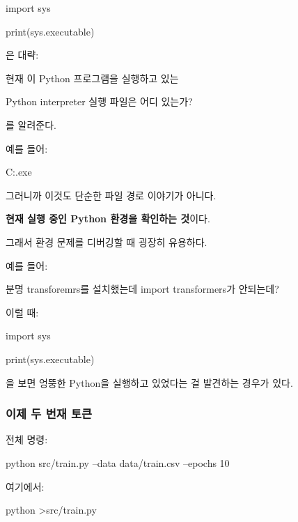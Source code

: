 \begin{dhkcode}
import sys

print(sys.executable)
\end{dhkcode}

은 대략:

\begin{dhknote}
\begin{dhksmry}[centered]
현재 이 Python 프로그램을 실행하고 있는

Python interpreter 실행 파일은 어디 있는가?
\end{dhksmry}
\end{dhknote}

를 알려준다.

예를 들어:

\begin{dhkzsh}
C:\Users\user{}\envs\transformer\python.exe
\end{dhkzsh}

그러니까 이것도 단순한 파일 경로 이야기가 아니다.

\textbf{현재 실행 중인 Python 환경을 확인하는 것}이다.

그래서 환경 문제를 디버깅할 때 굉장히 유용하다.

예를 들어:

\begin{dhksmry}[centered]
분명 transforemrs를 설치했는데 import transformers가 안되는데?
\end{dhksmry}

이럴 때:

\begin{dhkcode}
import sys

print(sys.executable)
\end{dhkcode}

을 보면 엉뚱한 Python을 실행하고 있었다는 걸 발견하는 경우가 있다.

\subsubsection{이제 두 번재 토큰 }

전체 명령:

\begin{dhkzsh}
python src/train.py --data data/train.csv --epochs 10
\end{dhkzsh}

여기에서:

\begin{dhkdir}
python
>src/train.py
\end{dhkdir}

